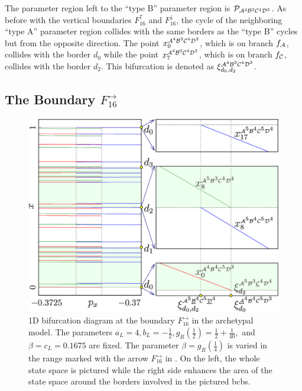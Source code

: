 The parameter region left to the ``type B'' parameter region is $\mathcal{P}_{\mathcal{A}^4\mathcal{B}^3\mathcal{C}^4\mathcal{D}^3}$.
As before with the vertical boundaries $F_{16}^\uparrow$ and $F_{16}^\downarrow$, the cycle of the neighboring ``type A'' parameter region collides with the same borders as the ``type B'' cycles but from the opposite direction.
The point $x_{0}^{\mathcal{A}^4\mathcal{B}^3\mathcal{C}^4\mathcal{D}^3}$, which is on branch $f_{\mathcal{A}}$, collides with the border $d_0$ while the point $x_{7}^{\mathcal{A}^4\mathcal{B}^3\mathcal{C}^4\mathcal{D}^3}$, which is on branch $f_{\mathcal{C}}$, collides with the border $d_2$.
This bifurcation is denoted as $\xi_{d_0, d_2}^{\mathcal{A}^4\mathcal{B}^3\mathcal{C}^4\mathcal{D}^3}$.

\subsection{The Boundary $F_{16}^\rightarrow$}
\label{sec:arch.bif.R}

\begin{figure}
	\centering
	\includegraphics[width=.7 \textwidth]{../Figures/6/6.9/result.png}
	\caption[1D bifurcation diagram at the boundary $F_{16}^\rightarrow$ in the archetypal model]{
		1D bifurcation diagram at the boundary $F_{16}^\rightarrow$ in the archetypal model.
		The parameters $a_L = 4, b_L = -\frac{1}{2}, g_R\left(\frac{1}{2}\right) = \frac{1}{2} + \frac{1}{40},$ and $\beta = c_L = 0.1675$ are fixed.
		The parameter $\beta = g_R\left(\frac{1}{4}\right)$ is varied in the range marked with the arrow $F_{16}^\rightarrow$ in .
		On the left, the whole state space is pictured while the right side enhances the area of the state space around the borders involved in the pictured \glspl{bcb}.
	}
	\label{fig:arch.bif.F.right}
\end{figure}


